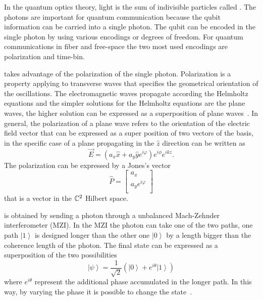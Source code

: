 In the quantum optics theory, light is the sum of indivisible particles called . The photons are important for quantum communication because the qubit information can be carried into a single photon. The qubit can be encoded in the single photon by using various encodings or degrees of freedom. For quantum communications in fiber and free-space the two most used encodings are polarization and time-bin.

 takes advantage of the polarization of the single photon. Polarization is a property applying to transverse waves that specifies the geometrical orientation of the oscillations. The electromagnetic waves propagate according the Helmholtz equations and the simpler solutions for the Helmholtz equations are the plane waves, the higher solution can be expressed as a superposition of plane waves~\cite{a21}. In general, the polarization of a plane wave refers to the orientation of the electric field vector that can be expressed as a super position of two vectors of the basis, in the specific case of a plane propagating in the $\hat{z}$ direction can be written as
\begin{equation}
  \vec{E} = (a_x \hat{x} + a_y \hat{y} e^{i \varphi}) e^{i \phi} e^{i k z}.
\end{equation}
The polarization can be expressed by a Jones's vector
\begin{equation}
  \hat{P} = \begin{bmatrix} a_x \\ a_y e^{i\varphi} \\ \end{bmatrix}
\end{equation}
that is a vector in the $\mathbb{C}^2$ Hilbert space.

 is obtained by sending a photon through a unbalanced Mach-Zehnder interferometer (MZI). In the MZI the photon can take one of the two paths, one path $\left|1\right>$ is designed longer than the other one $\left|0\right>$ by a length bigger than the coherence length of the photon. The final state can be expressed as a superposition of the two possibilities
\begin{equation}
  \left|\psi\right> = \frac{1}{\sqrt{2}} (\left|0\right> + e^{i\theta}\left|1\right>)
\end{equation}
where $e^{i \theta}$ represent the additional phase accumulated in the longer path. In this way, by varying the phase it is possible to change the state~\cite{a22}.

